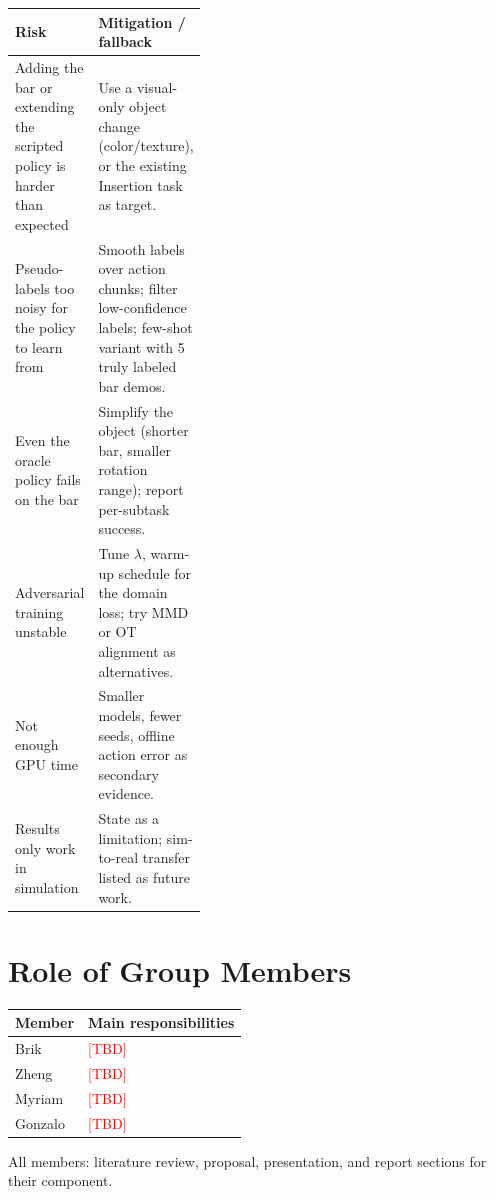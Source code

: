 \documentclass[11pt]{article}
\newcommand{\todo}[1]{\textcolor{red}{[#1]}}
\begin{document}
\begin{center}
\renewcommand{\arraystretch}{1.3}
\begin{tabularx}{\linewidth}{@{}>{\raggedright\arraybackslash}p{0.38\linewidth}X@{}}
\toprule
\textbf{Risk} & \textbf{Mitigation / fallback} \\
\midrule
Adding the bar or extending the scripted policy is harder than expected
  & Use a visual-only object change (color/texture), or the existing
    Insertion task as target. \\
Pseudo-labels too noisy for the policy to learn from
  & Smooth labels over action chunks; filter low-confidence labels; few-shot
    variant with 5 truly labeled bar demos. \\
Even the oracle policy fails on the bar
  & Simplify the object (shorter bar, smaller rotation range); report
    per-subtask success. \\
Adversarial training unstable
  & Tune $\lambda$, warm-up schedule for the domain loss; try MMD or OT
    alignment as alternatives. \\
Not enough GPU time
  & Smaller models, fewer seeds, offline action error as secondary
    evidence. \\
Results only work in simulation
  & State as a limitation; sim-to-real transfer listed as future work. \\
\bottomrule
\end{tabularx}
\end{center}

\section{Role of Group Members}

\begin{center}
\renewcommand{\arraystretch}{1.3}
\begin{tabularx}{\linewidth}{@{}lX@{}}
\toprule
\textbf{Member} & \textbf{Main responsibilities} \\
\midrule
Brik    & \todo{TBD} \\
Zheng   & \todo{TBD} \\
Myriam  & \todo{TBD} \\
Gonzalo & \todo{TBD} \\
\bottomrule
\end{tabularx}
\end{center}

\noindent All members: literature review, proposal, presentation, and report
sections for their component.



\end{document}
